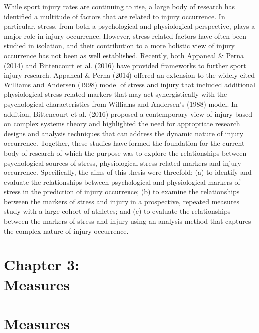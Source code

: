 \documentclass[
  english,
  man,floatsintext]{apa6}
\begin{document}
While sport injury rates are continuing to rise, a large body of research has identified a multitude of factors that are related to injury occurrence.
In particular, stress, from both a psychological and physiological perspective, plays a major role in injury occurrence.
However, stress-related factors have often been studied in isolation, and their contribution to a more holistic view of injury occurrence has not been as well established.
Recently, both Appaneal \& Perna (2014) and Bittencourt et al. (2016) have provided frameworks to further sport injury research.
Appaneal \& Perna (2014) offered an extension to the widely cited Williams and Andersen (1998) model of stress and injury that included additional physiological stress-related markers that may act synergistically with the psychological characteristics from Williams and Andersen's (1988) model.
In addition, Bittencourt et al. (2016) proposed a contemporary view of injury based on complex systems theory and highlighted the need for appropriate research designs and analysis techniques that can address the dynamic nature of injury occurrence.
Together, these studies have formed the foundation for the current body of research of which the purpose was to explore the relationships between psychological sources of stress, physiological stress-related markers and injury occurrence.
Specifically, the aims of this thesis were threefold:
(a) to identify and evaluate the relationships between psychological and physiological markers of stress in the prediction of injury occurrence;
(b) to examine the relationships between the markers of stress and injury in a prospective, repeated measures study with a large cohort of athletes; and
(c) to evaluate the relationships between the markers of stress and injury using an analysis method that captures the complex nature of injury occurrence.

\clearpage

\vspace*{3cm}

\section[Chapter 3: Measures]{\Large{Chapter 3: \\ Measures}}

\clearpage

\hypertarget{measures}{%
\section{Measures}\label{measures}}
\end{document}
